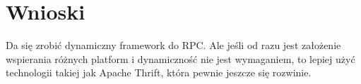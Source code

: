 
\section{Wnioski}
Da się zrobić dynamiczny framework do RPC. Ale jeśli od razu jest założenie wspierania różnych platform i dynamiczność nie jest wymaganiem, to lepiej użyć technologii takiej jak Apache Thrift, która pewnie jeszcze się rozwinie.